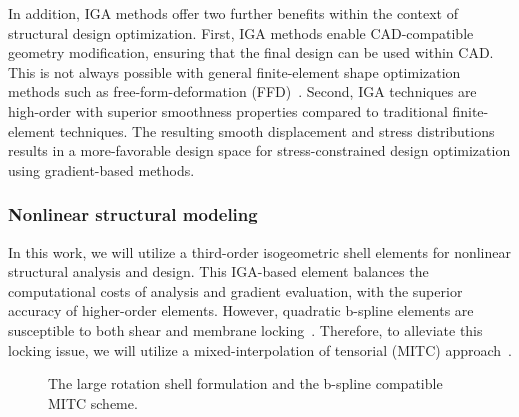 \documentclass[]{aiaa-tc}
\begin{document}
In addition, IGA methods offer two further benefits within the context
of structural design optimization. First, IGA methods enable
CAD-compatible geometry modification, ensuring that the final design
can be used within CAD. This is not always possible with general
finite-element shape optimization methods such as
free-form-deformation (FFD)~\cite{Sederberg:1986:FFD,
  Kenway:2010:CAD}.  Second, IGA techniques are high-order with
superior smoothness properties compared to traditional finite-element
techniques. The resulting smooth displacement and stress distributions
results in a more-favorable design space for stress-constrained design
optimization using gradient-based methods.

\subsubsection{Nonlinear structural modeling}

In this work, we will utilize a third-order isogeometric shell
elements for nonlinear structural analysis and design.  This IGA-based
element balances the computational costs of analysis and gradient
evaluation, with the superior accuracy of higher-order
elements. However, quadratic b-spline elements are susceptible to both
shear and membrane locking~\cite{Babuska:1992:OLR,
  Chapelle.Bathe}. Therefore, to alleviate this locking issue, we will
utilize a mixed-interpolation of tensorial (MITC)
approach~\cite{Dvorkin:1984:CMB, Bucalem:1993:HOM}.

\begin{figure}[h]
  \centering
  \caption{The large rotation shell formulation and the b-spline
    compatible MITC scheme.}
  \label{fig:shell-figs}
\end{figure}
\end{document}
